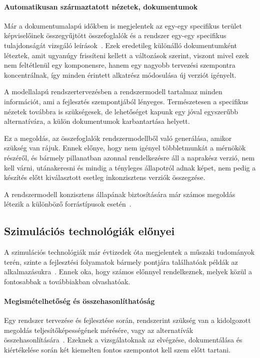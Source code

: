         \paragraph{Automatikusan származtatott nézetek, dokumentumok}
        Már a dokumentumalapú időkben is megjelentek az egy-egy specifikus terület képviselőinek összegyűjtött összefoglalók és a rendszer egy-egy specifikus tulajdonságát vizsgáló leírások~\cite{Bajaj_2022}.
        Ezek eredetileg különálló dokumentumként léteztek, amit ugyanúgy frissíteni kellett a változások szerint, viszont mivel ezek nem feltétlenül egy komponensre, hanem egy nagyobb tervezési szempontra koncentrálnak, így minden érintett alkatrész módosulása új verziót igényelt.
        
        A modellalapú rendszertervezésben a rendszermodell tartalmaz minden információt, ami a fejlesztés szempontjából lényeges.
        Természetesen a specifikus nézetek továbbra is szükségesek, de lehetőséget kapunk egy jóval egyszerűbb alternatívára, a külön dokumentumok karbantartása helyett.
        
        Ez a megoldás, az összefoglalók rendszermodellből való generálása, amikor szükség van rájuk. Ennek előnye, hogy nem igényel többletmunkát a mérnökök részéről, és bármely pillanatban azonnal rendelkezésre áll a naprakész verzió, nem kell várni, utánakeresni és mindig a tényleges állapotról adnak képet, nem pedig a készítés előtt kiválasztott esetleg inkonzisztens verziók összegzése\cite{Madni_2018}.
        
        A rendszermodell konzisztens állapának biztosítására már számos megoldás létezik a különböző forrástípusok esetén~\cite{Git2024, LieberLieber2024}.

    \subsection{Szimulációs technológiák előnyei} \label{sec:szimElonyok}
    A szimulációs technológiák már évtizedek óta megjelentek a műszaki tudományok terén, szinte a fejlesztési folyamatok bármely pontjára találhatóak példák az alkalmazásukra~\cite{Gianni2017}.
    Ennek oka, hogy számos előnnyel rendelkeznek, melyek közül a fontosabbak a továbbiakban olvashatóak.

        \paragraph{Megismételhetőség és összehasonlíthatóság}
        Egy rendszer tervezése és fejlesztése során, rendszerint szükség van a kidolgozott megoldás teljesítőképességének mérésére, vagy az alternatívák összehasonlítására~\cite{Gianni2017}.
        Ezeknek a vizsgálatoknak az elvégzése, dokumentálása és kiértékelése során két kiemelten fontos szempontot kell szem előtt tartani.
        
